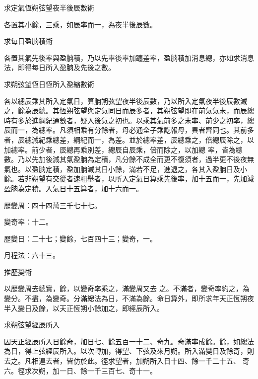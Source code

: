 \begin{pinyinscope}
 求定氣恆朔弦望夜半後辰數術



 各置其小餘，三乘，如辰率而一，為夜半後辰數。



 求每日盈朒積術



 各置其氣先後率與盈朒積，乃以先率後率加躔差率，盈朒積加消息總，亦如求消息法，即得每日所入盈朒及先後之數。



 求朔弦望恆日恆所入盈縮數術



 各以總辰乘其所入定氣日，算朒朔弦望夜半後辰數，乃以所入定氣夜半後辰數減之，餘為辰總。其恆朔弦望與定氣同日而辰多者，其朔弦望即在前氣氣末，而辰總時有多於進綱紀通數者，疑入後氣之初也。以乘其氣前多之末率、前少之初率，總辰而一，為總率。凡須相乘有分餘者，母必通全子乘訖報母，異者齊同也。其前多者，辰總減紀乘總差，綱紀而一，為差。並於總率差，辰總乘之，倍總辰除之，以加總率。前少者，辰總再乘別差，總辰自辰乘，倍而除之，以加總
 率，皆為總數。乃以先加後減其氣盈朒為定積，凡分餘不成全而更不復須者，過半更不後夜無氣也。以盈朒定積，盈加朒減其日小餘，滿若不足，進退之，各其入盈朒日及小餘。若非朔望有交從者速粗舉者，以所入定氣日算乘先後率，加十五而一，先加減盈朒為定積。入氣日十五算者，加十六而一。



 歷變周：四十四萬三千七十七。



 變奇率：十二。



 歷變日：二十七；變餘，七百四十三；變奇，一。



 月程法：六十三。



 推歷變術



 以歷變周去總實，餘，以變奇率乘之，滿變周又去
 之。不滿者，變奇率約之，為變分。不盡，為變奇。分滿總法為日，不滿為餘。命日算外，即所求年天正恆朔夜半入變日及餘，以天正恆朔小餘加之，即經辰所入。



 求朔弦望經辰所入



 因天正經辰所入日餘奇，加日七、餘五百一十二、奇九。奇滿率成餘。餘，如總法為日，得上弦經辰所入。以次轉加，得望、下弦及來月朔。所入滿變日及餘奇，則去之。凡相連去者，皆仿於此。徑求望者，加朔所入日十四、餘一千二十五、
 奇六。徑求次朔，加一日、餘一千三百七、奇十一。




\end{pinyinscope}
